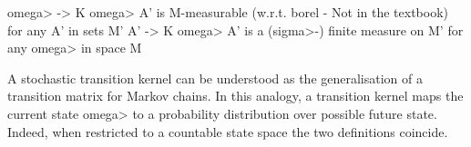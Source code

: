\begin{isabellebody}
\begin{isamarkuptext}
  \<omega> -> K \<omega> A' is M-measurable (w.r.t. borel - Not in the textbook) for any A' in sets M'
  A' -> K \<omega> A' is a (\<sigma>-) finite measure on M' for any \<omega> in space M%
\end{isamarkuptext}\isamarkuptrue%
%
\begin{isamarkuptext}%
A stochastic transition kernel can be understood as the generalisation of a transition matrix
  for Markov chains. In this analogy, a transition kernel maps the current state \<omega> to a probability
  distribution over possible future state. Indeed, when restricted to a countable state space the
  two definitions coincide.%
\end{isamarkuptext}\isamarkuptrue%
%
\end{isabellebody}

